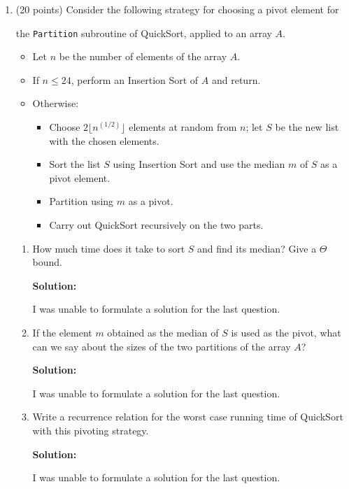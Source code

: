 \documentclass[12pt]{article}
\begin{document}
\begin{enumerate}
	\item (20 points) Consider the following strategy for choosing a pivot element for \par 
	the {\tt Partition} subroutine of QuickSort, applied to an array $A$.\par
    \begin{itemize}
    	\item Let $n$ be the number of elements of the array $A$.\par
    	\item If $n\leq 24$, perform an Insertion Sort of $A$ and return.\par
    	\item Otherwise:
    	\begin{itemize}
    		\item Choose $2\lfloor n^{(1/2)} \rfloor$ elements at random from $n$; let $S$ be the new list with the chosen elements.
    		\item Sort the list $S$ using Insertion Sort and use the median $m$ of $S$ as a pivot element.
    		\item Partition using $m$ as a pivot.
    		\item Carry out QuickSort recursively on the two parts.
		\end{itemize}
    \end{itemize}
    \begin{enumerate}
    	\item How much time does it take to sort $S$ and find its median? Give a $\Theta$ bound.\par
		\textbf{Solution:}\par
		I was unable to formulate a solution for the last question.
    	\item If the element $m$ obtained as the median of $S$ is used as the pivot, what can we say about the sizes of the two partitions of the array $A$?\par
		\textbf{Solution:}\par
		I was unable to formulate a solution for the last question.
    	\item Write a recurrence relation for the worst case running time of QuickSort with this pivoting strategy.\par
		\textbf{Solution:}\par
		I was unable to formulate a solution for the last question.
    \end{enumerate}

\end{enumerate}
\end{document}
